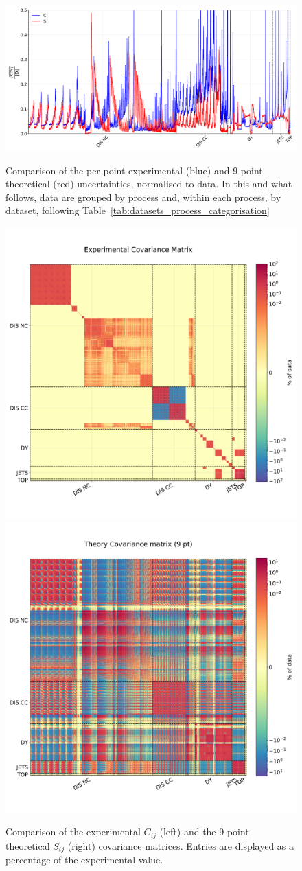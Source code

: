 \begin{figure}[t!]
  \begin{center}
    \includegraphics[width=1.0\linewidth]{mhous/plots/9pt_diagonal_elements.pdf}
    \caption{\small Comparison of the per-point experimental 
    (blue) and 9-point theoretical (red) uncertainties, normalised to data. In this and what follows, data are grouped by process and, within each process, by dataset, following
  Table~\ref{tab:datasets_process_categorisation} 
        \label{fig:diag_covmats} }
  \end{center}
  \begin{center}
    \includegraphics[width=0.49\linewidth]{mhous/plots/exp_covmat.pdf}
    \includegraphics[width=0.49\linewidth]{mhous/plots/th_covmat_9pt.pdf}
    \caption{\small Comparison of the  experimental $C_{ij}$ (left)
      and the 9-point theoretical  $S_{ij}$  
      (right) covariance matrices.
      Entries are displayed as a percentage of the experimental value.
      }
  \end{center}
\end{figure}
